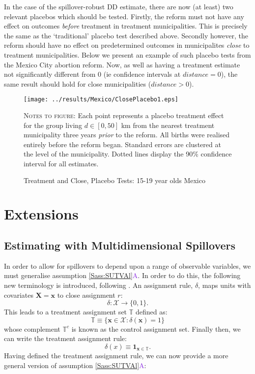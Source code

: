 \documentclass{article}
\newcommand{\asref}[2]{\ref{#1}{\textcolor{BlueViolet}{#2}}}
\begin{document}
\begin{spacing}{1.1}
In the case of the spillover-robust DD estimate, there are now (at least) two
relevant placebos which should be tested.  Firstly, the reform must not have any
effect on outcomes \emph{before} treatment in treatment municipalities.  This is
precisely the same as the `traditional' placebo test described above.  Secondly
however, the reform should have no effect on predetermined outcomes in municipalites
\emph{close} to treatment municipalities.  Below we present an example of such 
placebo tests from the Mexico City abortion reform.  Now, as well as having a 
treatment estimate not significantly different from 0 (ie confidence intervals
at $distance=0$), the same result should hold for close municipalities ($distance>0$).
\begin{figure}[htpb!]
\texttt{[image: ../results/Mexico/ClosePlacebo1.eps]}
\caption{Treatment and Close, Placebo Tests: 15-19 year olds Mexico}
\label{SFig:MexClose}
\vspace{2mm}
\begin{footnotesize}
\textsc{Notes to figure}: Each point represents a placebo treatment effect for the 
group living $d\in [0,50]$ km from the nearest treatment municipality three years
\emph{prior} to the reform.  All births were realised entirely before the reform
began.  Standard errors are clustered at the level of the municipality.  Dotted 
lines display the 90\% confidence interval for all estimates.
\end{footnotesize}
\end{figure}


\section{Extensions}
\label{Sscn:extend}
\subsection{Estimating with Multidimensional Spillovers}
In order to allow for spillovers to depend upon a range of observable variables,
we must generalise assumption \asref{Sass:SUTVAl}{A}.  In order to do this, the
following new terminology is introduced, following \citet{Zajonc2012}. An 
assignment rule, $\delta$, maps units with covariates $\mathbf{X=x}$ to close
assignment $r$:
\[
\delta: \mathcal{X} \rightarrow \{0,1\}.
\]
This leads to a treatment assignment set $\mathbb{T}$ defined as:
\[
\mathbb{T}\equiv \{ \mathbf{x}\in\mathcal{X}: \delta(\mathbf{x})=1 \}
\]
whose complement $\mathbb{T}^c$ is known as the control assignment
set. Finally then, we can write the treatment assignment rule:
\begin{equation}
\delta(x)\equiv \mathbf{1}_{\mathbf{x}\in\mathbb{T}}.
\end{equation}
Having defined the treatment assignment rule, we can now provide a
more general version of assumption \asref{Sass:SUTVAl}{A}:


\end{spacing}
\end{document}

